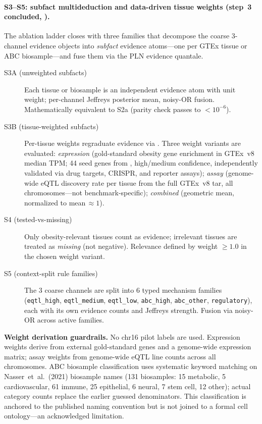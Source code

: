 \documentclass[11pt,openany]{report}
\begin{document}
\paragraph{S3--S5: subfact multideduction and data-driven tissue weights
  (step~3 concluded, \claimOperational{}).}
The ablation ladder closes with three families that decompose the coarse
3-channel evidence objects into \emph{subfact} evidence atoms---one per
GTEx tissue or ABC biosample---and fuse them via the PLN evidence quantale.
\begin{description}
\item[S3A (unweighted subfacts)]
  Each tissue or biosample is an independent evidence atom with unit weight;
  per-channel Jeffreys posterior mean, noisy-OR fusion.
  Mathematically equivalent to S2a (parity check passes to $<10^{-6}$).
\item[S3B (tissue-weighted subfacts)]
  Per-tissue weights regraduate evidence via .
  Three weight variants are evaluated:
  \emph{expression} (gold-standard obesity gene enrichment in GTEx~v8
  median TPM; 44 seed genes from
  , high/medium confidence,
  independently validated via drug targets, CRISPR, and reporter assays);
  \emph{assay} (genome-wide eQTL discovery rate per tissue from the full
  GTEx~v8 tar, all chromosomes---not benchmark-specific);
  \emph{combined} (geometric mean, normalized to mean$\,\approx 1$).
\item[S4 (tested-vs-missing)]
  Only obesity-relevant tissues count as evidence; irrelevant tissues are
  treated as \emph{missing} (not negative).  Relevance defined by weight
  $\geq 1.0$ in the chosen weight variant.
\item[S5 (context-split rule families)]
  The 3 coarse channels are split into 6 typed mechanism families
  (\texttt{eqtl\_high}, \texttt{eqtl\_medium}, \texttt{eqtl\_low},
  \texttt{abc\_high}, \texttt{abc\_other}, \texttt{regulatory}),
  each with its own evidence counts and Jeffreys strength.
  Fusion via noisy-OR across active families.
\end{description}

\noindent
\textbf{Weight derivation guardrails.}
No chr16 pilot labels are used.  Expression weights derive from external
gold-standard genes and a genome-wide expression matrix; assay weights
from genome-wide eQTL line counts across all chromosomes.  ABC biosample
classification uses systematic keyword matching on Nasser~et~al.\ (2021)
biosample names (131 biosamples: 15 metabolic, 5 cardiovascular,
61 immune, 25 epithelial, 6 neural, 7 stem cell, 12 other); actual
category counts replace the earlier guessed denominators.
This classification is anchored to the published naming convention
but is not joined to a formal cell ontology---an acknowledged limitation.
\end{document}
